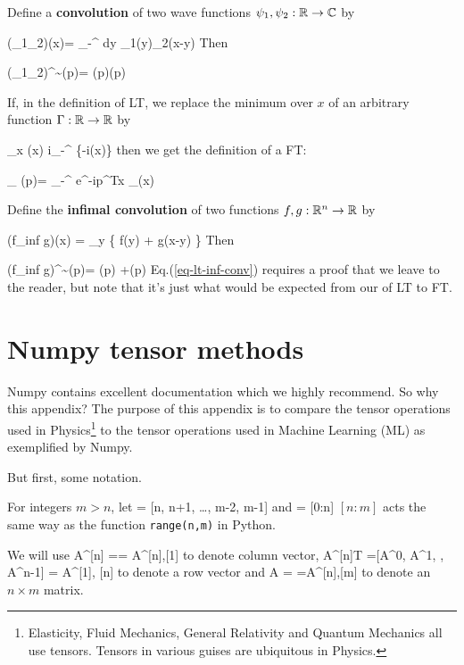 Define a {\bf convolution}
of two
wave functions $\psi_1,
\psi_2:{ \mathbb{R}}\rightarrow { \mathbb{C}}$
by


\beq
(\psi_1\circledast\psi_2)(x)=
\int_{-\infty}^{\infty}
dy\;
\psi_1(y)\psi_2(x-y)
\eeq
Then

\beq
(\psi_1\circledast\psi_2)^\sim(p)=
(p)(p)
\eeq

If, in the definition
of LT,
we replace the minimum
over $x$ of
an arbitrary function $\Gamma:{ \mathbb{R}}\rightarrow { \mathbb{R}}$
by

\beq
\min_x \Gamma(x)\rarrow
i\ln\int_{-\infty}^{\infty}
\exp\{-i\Gamma(x)\}
\eeq
then we get the
definition
of a FT:

\beq
{}_
{\TIL{\psi}(p)}=
\int_{-\infty}^{\infty}
\;
e^{-ip^Tx}
_{\psi(x)}
\eeq

Define the
{\bf infimal convolution}
of two functions
$f,g:{ \mathbb{R}}^n\rightarrow { \mathbb{R}}$ by

\beq
(f\circledast_{inf} g)(x)
=
\min_y \left\{
f(y) + g(x-y)
\right\}
\eeq
Then

\beq
(f\circledast_{inf} g)^\sim(p)=
(p) +(p)
\label{eq-lt-inf-conv}
\eeq
Eq.(\ref{eq-lt-inf-conv}) requires
a proof that we leave to the reader,
but note that it's just
what would be expected
from our  of
LT to FT.

\section{Numpy tensor methods}
\label{sec-numpy-tensors}

Numpy contains
excellent documentation
which we highly recommend.
So why this appendix?
The purpose of this appendix is
to compare the tensor
operations
used in Physics\footnote{Elasticity, Fluid Mechanics, General Relativity and Quantum Mechanics all use tensors. Tensors in various guises are ubiquitous in Physics.}
to the tensor operations
used in Machine Learning (ML) as exemplified by Numpy.

 But first, some notation.

For integers $m> n$, let
\beq
[n:m] = [n, n+1, \ldots, m-2, m-1]
\eeq
and
\beq
[n] = [0:n]
\eeq
$[n:m]$ acts the
same way as
the function {\tt range(n,m)} in Python.

We will use
\beq
A^{[n]} = =
A^{[n],[1]}
\eeq
to denote column vector,
\beq
A^{[n]T} =[A^0, A^1, \cdots, A^{n-1}] =
A^{[1], [n]}
\eeq
to denote a row vector
and
\beq
A = =A^{[n],[m]}
\eeq
to denote an $n\times m$ matrix.

